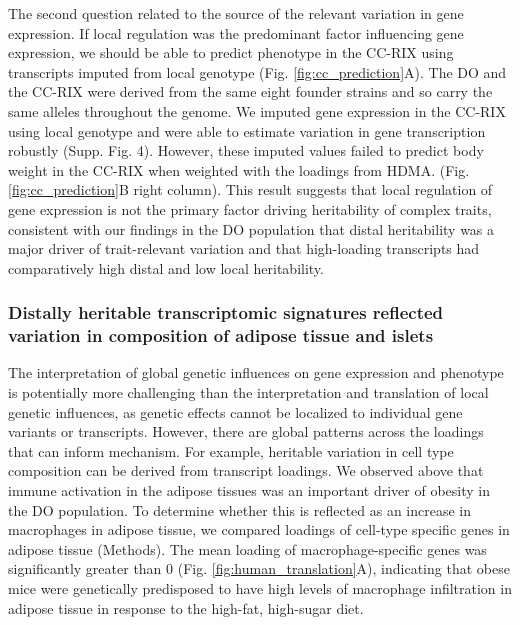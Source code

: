 \documentclass[
]{article}
\begin{document}
The second question related to the source of the relevant variation in
gene expression. If local regulation was the predominant factor
influencing gene expression, we should be able to predict phenotype in
the CC-RIX using transcripts imputed from local genotype (Fig.
\ref{fig:cc_prediction}A). The DO and the CC-RIX were derived from the
same eight founder strains and so carry the same alleles throughout the
genome. We imputed gene expression in the CC-RIX using local genotype
and were able to estimate variation in gene transcription robustly
(Supp. Fig. 4). However, these imputed values failed to predict body
weight in the CC-RIX when weighted with the loadings from HDMA. (Fig.
\ref{fig:cc_prediction}B right column). This result suggests that local
regulation of gene expression is not the primary factor driving
heritability of complex traits, consistent with our findings in the DO
population that distal heritability was a major driver of trait-relevant
variation and that high-loading transcripts had comparatively high
distal and low local heritability.

\subsubsection{Distally heritable transcriptomic signatures reflected
variation in composition of adipose tissue and
islets}\label{distally-heritable-transcriptomic-signatures-reflected-variation-in-composition-of-adipose-tissue-and-islets}

The interpretation of global genetic influences on gene expression and
phenotype is potentially more challenging than the interpretation and
translation of local genetic influences, as genetic effects cannot be
localized to individual gene variants or transcripts. However, there are
global patterns across the loadings that can inform mechanism. For
example, heritable variation in cell type composition can be derived
from transcript loadings. We observed above that immune activation in
the adipose tissues was an important driver of obesity in the DO
population. To determine whether this is reflected as an increase in
macrophages in adipose tissue, we compared loadings of cell-type
specific genes in adipose tissue (Methods). The mean loading of
macrophage-specific genes was significantly greater than 0 (Fig.
\ref{fig:human_translation}A), indicating that obese mice were
genetically predisposed to have high levels of macrophage infiltration
in adipose tissue in response to the high-fat, high-sugar diet.
\end{document}
